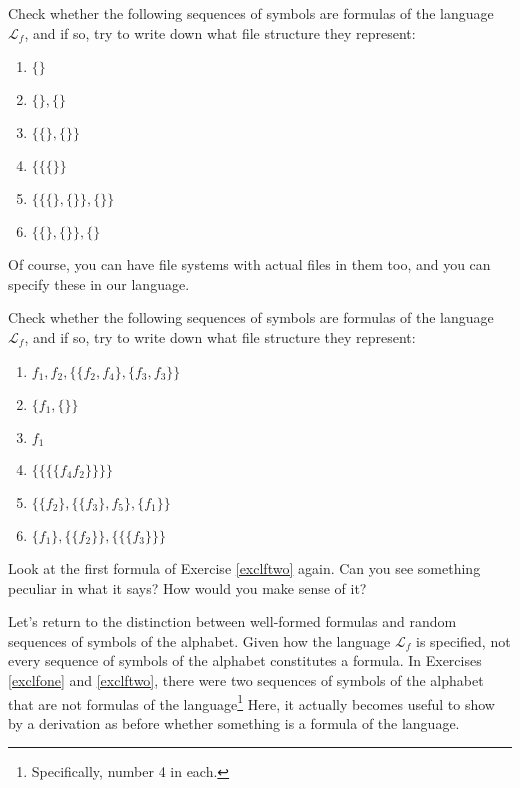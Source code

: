 \begin{exc} \label{exclfone}
Check whether the following sequences of symbols are formulas of the language $\mathcal{L}_f$, and if so, try to write down what file structure they represent:

\begin{enumerate}
	\item $\{\}$
	\item $\{\}, \{\}$
	\item $\{\{\},\{\}\}$
	\item $\{\{\{\}\}$
	\item $\{\{\{\}, \{\}\}, \{\}\}$
	\item $\{\{\}, \{\}\}, \{\}$
\end{enumerate}
\end{exc}

Of course, you can have file systems with actual files in them too, and you can specify these in our language. 

\begin{exc} \label{exclftwo}
Check whether the following sequences of symbols are formulas of the language $\mathcal{L}_f$, and if so, try to write down what file structure they represent:

\begin{enumerate}
	\item $f_1, f_2, \{\{f_2, f_4\}, \{f_3,f_3\}\}$ 
	\item $\{f_1, \{\}\}$
	\item $f_1$
	\item $\{\{\{\{f_4f_2\}\}\}\}$
	\item $\{\{f_2\}, \{\{f_3\}, f_5\}, \{f_1\}\}$
	\item $\{f_1\}, \{\{f_2\}\}, \{\{\{f_3\}\}\}$
\end{enumerate}
\end{exc}

\begin{exc}
Look at the first formula of Exercise \ref{exclftwo} again. Can you see something peculiar in what it says? How would you make sense of it?
\end{exc}

Let's return to the distinction between well-formed formulas and random sequences of symbols of the alphabet. Given how the language $\mathcal{L}_f$ is specified, not every sequence of symbols of the alphabet constitutes a formula. In Exercises \ref{exclfone} and \ref{exclftwo}, there were two sequences of symbols of the alphabet that are not formulas of the language\footnote{Specifically, number 4 in each.} Here, it actually becomes useful to show by a derivation as before whether something is a formula of the language. 

